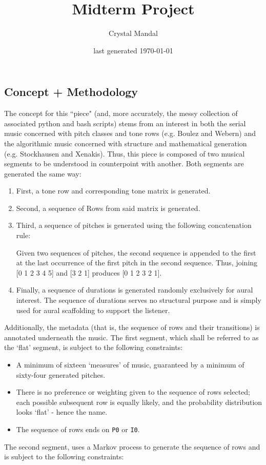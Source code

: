 \documentclass[10pt,letterpaper]{article}
\title{Midterm Project}
\author{Crystal Mandal}
\date{last generated \today}
\newcommand{\code}[1]{\colorbox{light-gray}{\texttt{#1}}}
\begin{document}
\maketitle

\subsection*{Concept + Methodology}
The concept for this ``piece" (and, more accurately, the
messy collection of associated python and bash scripts) stems
from an interest in both the serial music concerned with pitch
classes and tone rows (e.g. Boulez and Webern) and the algorithmic
music concerned with structure and mathematical generation (e.g.
Stockhausen and Xenakis). Thus, this piece is composed of two
musical segments to be understood in counterpoint with another.
Both segments are generated the same way:

\begin{enumerate}
  \item First, a tone row and corresponding tone matrix is generated.
  \item Second, a sequence of Rows from said matrix is generated.
  \item Third, a sequence of pitches is generated using the following concatenation rule:
    \begin{center}
      Given two sequences of pitches, the second sequence is appended to the
      first at the last occurrence of the first pitch in the second sequence. Thus,
    joining [0 1 2 3 4 5] and [3 2 1] produces [0 1 2 3 2 1].
    \end{center}
  \item Finally, a sequence of durations is generated randomly exclusively for
    aural interest. The sequence of durations serves no structural purpose and is
    simply used for aural scaffolding to support the listener.
\end{enumerate}

Additionally, the metadata (that is, the sequence of rows and their transitions)
is annotated underneath the music.
The first segment, which shall be referred to as the `flat' segment, is
subject to the following constraints:

\clearpage{}

\begin{itemize}
  \item{A minimum of sixteen `measures' of music, guaranteed by a minimum of
    sixty-four generated pitches.}
  \item{There is no preference or weighting given to the sequence of rows selected;
      each possible subsequent row is equally likely, and the probability
      distribution looks `flat' - hence the name.}
  \item{The sequence of rows ends on \code{P0} or \code{I0}. }
\end{itemize}
The second segment, uses a Markov process to generate the sequence of rows and
is subject to the following constraints:
\end{document}
